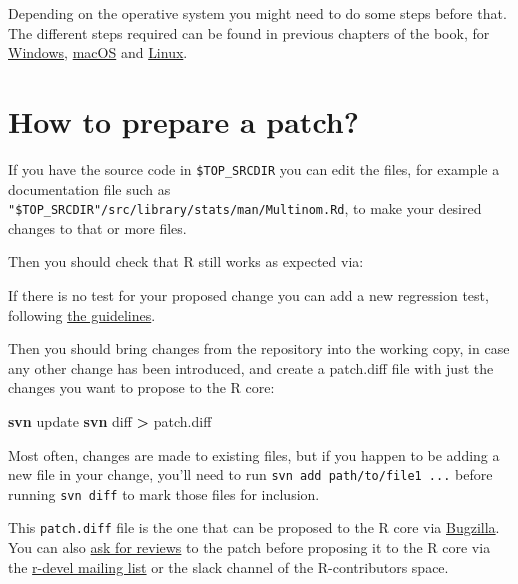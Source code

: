 \documentclass[
]{book}
\newenvironment{Shaded}{\begin{snugshade}}{\end{snugshade}}
\newcommand{\BuiltInTok}[1]{#1}
\newcommand{\FunctionTok}[1]{\textcolor[rgb]{0.13,0.29,0.53}{\textbf{#1}}}
\newcommand{\NormalTok}[1]{#1}
\newcommand{\OperatorTok}[1]{\textcolor[rgb]{0.81,0.36,0.00}{\textbf{#1}}}
\newcommand{\StringTok}[1]{\textcolor[rgb]{0.31,0.60,0.02}{#1}}
\newcommand{\VariableTok}[1]{\textcolor[rgb]{0.00,0.00,0.00}{#1}}
\begin{document}
Depending on the operative system you might need to do some steps before that.
The different steps required can be found in previous chapters of the book, for \hyperref[windowsSource]{Windows}, \hyperref[macos]{macOS} and \hyperref[linux]{Linux}.

\section{How to prepare a patch?}\label{how-to-prepare-a-patch}

If you have the source code in \texttt{\$TOP\_SRCDIR} you can edit the files, for example a documentation file such as \texttt{"\$TOP\_SRCDIR"/src/library/stats/man/Multinom.Rd}, to make your desired changes to that or more files.

Then you should check that R still works as expected via:

\begin{Shaded}
\end{Shaded}

If there is no test for your proposed change you can add a new regression test, following \hyperref[TestRVer]{the guidelines}.

Then you should bring changes from the repository into the working copy, in case any other change has been introduced, and create a patch.diff file with just the changes you want to propose to the R core:

\begin{Shaded}
\begin{Highlighting}[]
\FunctionTok{svn}\NormalTok{ update}
\FunctionTok{svn}\NormalTok{ diff }\OperatorTok{\textgreater{}}\NormalTok{ patch.diff}
\end{Highlighting}
\end{Shaded}

Most often, changes are made to existing files, but if you happen to be adding a new file in your change, you'll need to run \texttt{svn\ add\ path/to/file1\ ...} before running \texttt{svn\ diff} to mark those files for inclusion.

This \texttt{patch.diff} file is the one that can be proposed to the R core via \hyperref[SubmitPatches]{Bugzilla}. You can also \hyperref[PatchesReview]{ask for reviews} to the patch before proposing it to the R core via the \href{https://stat.ethz.ch/mailman/listinfo/r-devel}{r-devel mailing list} or the slack channel of the R-contributors space.
\end{document}
